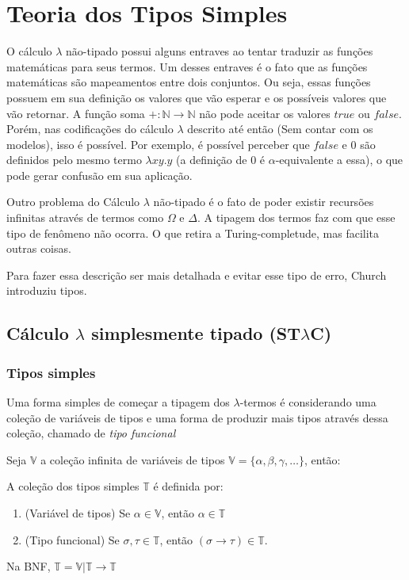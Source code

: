 \documentclass[../main.tex]{subfiles}
\begin{document}
\section{Teoria dos Tipos Simples}

O cálculo $\lambda$ não-tipado possui alguns entraves ao tentar traduzir as funções matemáticas para seus termos. Um desses entraves é o fato que as funções matemáticas são mapeamentos entre dois conjuntos. Ou seja, essas funções possuem em sua definição os valores que vão esperar e os possíveis valores que vão retornar. A função soma $+:\mathbb{N} \to \mathbb{N}$ não pode aceitar os valores $true$ ou $false$. Porém, nas codificações do cálculo $\lambda$ descrito até então (Sem contar com os modelos), isso é possível. Por exemplo, é possível perceber que $false$ e $0$ são definidos pelo mesmo termo $\lambda xy . y$ (a definição de $0$ é $\alpha$-equivalente a essa), o que pode gerar confusão em sua aplicação.

Outro problema do Cálculo $\lambda$ não-tipado é o fato de poder existir recursões infinitas através de termos como $\Omega$ e $\Delta$. A tipagem dos termos faz com que esse tipo de fenômeno não ocorra. O que retira a Turing-completude, mas facilita outras coisas.

Para fazer essa descrição ser mais detalhada e evitar esse tipo de erro, Church introduziu tipos.

\subsection[Cálculo lambda simplesmente tipado (STLC)]{Cálculo $\lambda$ simplesmente tipado (ST$\lambda$C)}

\subsubsection{Tipos simples}

Uma forma simples de começar a tipagem dos $\lambda$-termos é considerando uma coleção de variáveis de tipos e uma forma de produzir mais tipos através dessa coleção, chamado de \emph{tipo funcional}

Seja $\mathbb{V}$ a coleção infinita de variáveis de tipos $\mathbb{V} = \{ \alpha, \beta, \gamma, \dots \}$, então:

\begin{definition}
    A coleção dos tipos simples $\mathbb{T}$ é definida por:
    \begin{enumerate}
        \item (Variável de tipos) Se $\alpha \in \mathbb{V}$,  então $\alpha \in \mathbb{T}$
        \item (Tipo funcional) Se $\sigma, \tau \in \mathbb{T}$, então $(\sigma \to \tau) \in \mathbb{T}$.
    \end{enumerate}
    Na BNF, $\mathbb{T} = \mathbb{V} | \mathbb{T} \to \mathbb{T}$
\end{definition}
\end{document}
